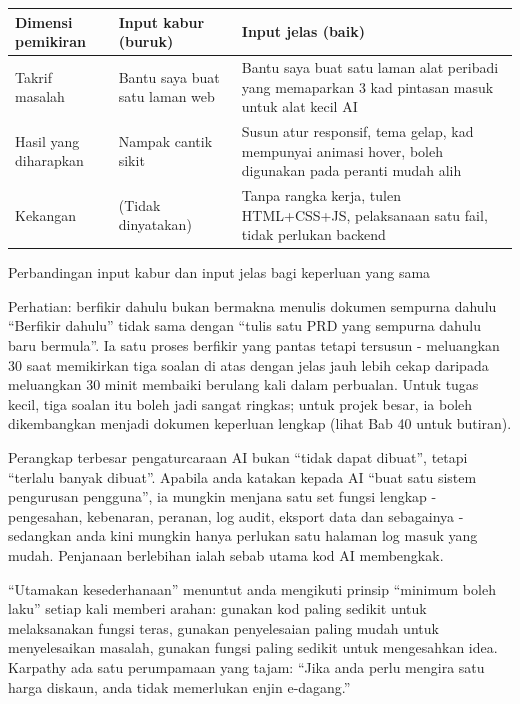 \begin{center}
\begin{tabularx}{\linewidth}{|X|X|X|}
\hline
\textbf{Dimensi pemikiran} & \textbf{Input kabur (buruk)} & \textbf{Input jelas (baik)} \tabularnewline
\hline
Takrif masalah & Bantu saya buat satu laman web & Bantu saya buat satu laman alat peribadi yang memaparkan 3 kad pintasan masuk untuk alat kecil AI \tabularnewline
Hasil yang diharapkan & Nampak cantik sikit & Susun atur responsif, tema gelap, kad mempunyai animasi hover, boleh digunakan pada peranti mudah alih \tabularnewline
Kekangan & (Tidak dinyatakan) & Tanpa rangka kerja, tulen HTML+CSS+JS, pelaksanaan satu fail, tidak perlukan backend \tabularnewline
\hline
\end{tabularx}
\end{center}

\begin{center}\small\color{gray}Perbandingan input kabur dan input jelas bagi keperluan yang sama\end{center}

\begin{tcbwarn}{Perhatian: berfikir dahulu bukan bermakna menulis dokumen sempurna dahulu}
“Berfikir dahulu” tidak sama dengan “tulis satu PRD yang sempurna dahulu baru bermula”. Ia satu proses berfikir yang pantas tetapi tersusun - meluangkan 30 saat memikirkan tiga soalan di atas dengan jelas jauh lebih cekap daripada meluangkan 30 minit membaiki berulang kali dalam perbualan. Untuk tugas kecil, tiga soalan itu boleh jadi sangat ringkas; untuk projek besar, ia boleh dikembangkan menjadi dokumen keperluan lengkap (lihat Bab 40 untuk butiran).

\end{tcbwarn}


Perangkap terbesar pengaturcaraan AI bukan “tidak dapat dibuat”, tetapi “terlalu banyak dibuat”. Apabila anda katakan kepada AI “buat satu sistem pengurusan pengguna”, ia mungkin menjana satu set fungsi lengkap - pengesahan, kebenaran, peranan, log audit, eksport data dan sebagainya - sedangkan anda kini mungkin hanya perlukan satu halaman log masuk yang mudah. Penjanaan berlebihan ialah sebab utama kod AI membengkak.

“Utamakan kesederhanaan” menuntut anda mengikuti prinsip “minimum boleh laku” setiap kali memberi arahan: gunakan kod paling sedikit untuk melaksanakan fungsi teras, gunakan penyelesaian paling mudah untuk menyelesaikan masalah, gunakan fungsi paling sedikit untuk mengesahkan idea. Karpathy ada satu perumpamaan yang tajam: “Jika anda perlu mengira satu harga diskaun, anda tidak memerlukan enjin e-dagang.”

